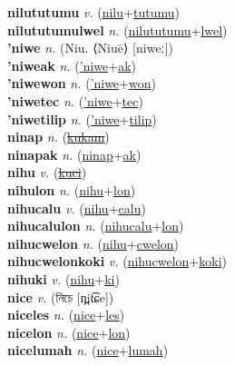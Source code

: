 \textbf{nilututumu} \textit{v.} (\hyperref[nilu]{nilu}+\hyperref[tutumu]{tutumu})
 \label{nilututumu} \\
\textbf{nilututumulwel} \textit{n.} (\hyperref[nilututumu]{nilututumu}+\hyperref[lwel]{lwel})
 \label{nilututumulwel} \\
\textbf{'niwe} \textit{n.} (Niu. ⟨Niuē⟩ [niweː])
 \label{'niwe} \\
\textbf{'niweak} \textit{n.} (\hyperref['niwe]{'niwe}+\hyperref[ak]{ak})
 \label{'niweak} \\
\textbf{'niwewon} \textit{n.} (\hyperref['niwe]{'niwe}+\hyperref[won]{won})
 \label{'niwewon} \\
\textbf{'niwetec} \textit{n.} (\hyperref['niwe]{'niwe}+\hyperref[tec]{tec})
 \label{'niwetec} \\
\textbf{'niwetilip} \textit{n.} (\hyperref['niwe]{'niwe}+\hyperref[tilip]{tilip})
 \label{'niwetilip} \\
\textbf{ninap} \textit{n.} (\hyperref[kukam]{\sout{kukam}})
 \label{ninap} \\
\textbf{ninapak} \textit{n.} (\hyperref[ninap]{ninap}+\hyperref[ak]{ak})
 \label{ninapak} \\
\textbf{nihu} \textit{v.} (\hyperref[kuci]{\sout{kuci}})
 \label{nihu} \\
\textbf{nihulon} \textit{n.} (\hyperref[nihu]{nihu}+\hyperref[lon]{lon})
 \label{nihulon} \\
\textbf{nihucalu} \textit{v.} (\hyperref[nihu]{nihu}+\hyperref[calu]{calu})
 \label{nihucalu} \\
\textbf{nihucalulon} \textit{n.} (\hyperref[nihucalu]{nihucalu}+\hyperref[lon]{lon})
 \label{nihucalulon} \\
\textbf{nihucwelon} \textit{n.} (\hyperref[nihu]{nihu}+\hyperref[cwelon]{cwelon})
 \label{nihucwelon} \\
\textbf{nihucwelonkoki} \textit{v.} (\hyperref[nihucwelon]{nihucwelon}+\hyperref[koki]{koki})
 \label{nihucwelonkoki} \\
\textbf{nihuki} \textit{v.} (\hyperref[nihu]{nihu}+\hyperref[ki]{ki})
 \label{nihuki} \\
\textbf{nice} \textit{v.} ({\bengali{}নিচে} [n̪it͡ɕe])
 \label{nice} \\
\textbf{niceles} \textit{n.} (\hyperref[nice]{nice}+\hyperref[les]{les})
 \label{niceles} \\
\textbf{nicelon} \textit{n.} (\hyperref[nice]{nice}+\hyperref[lon]{lon})
 \label{nicelon} \\
\textbf{nicelumah} \textit{n.} (\hyperref[nice]{nice}+\hyperref[lumah]{lumah})
